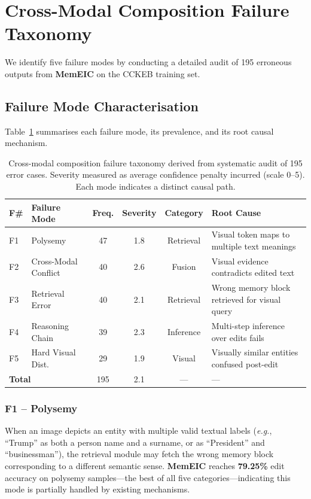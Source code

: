 \documentclass[11pt]{article}
\newcommand{\eg}{\textit{e.g.}}
\newcommand{\memeic}{\textbf{MemEIC}}
\begin{document}
\section{Cross-Modal Composition Failure Taxonomy}
\label{sec:taxonomy}

We identify five failure modes by conducting a detailed audit of 195 erroneous
outputs from \memeic{} on the CCKEB training set.

\subsection{Failure Mode Characterisation}

Table~\ref{tab:taxonomy} summarises each failure mode, its prevalence, and its
root causal mechanism.

\begin{table}[t]
\centering
\caption{Cross-modal composition failure taxonomy derived from systematic audit
of 195 error cases. Severity measured as average confidence penalty incurred
(scale 0--5). Each mode indicates a distinct causal path.}
\label{tab:taxonomy}
\small
\begin{tabular}{@{}llcccl@{}}
\toprule
\textbf{F\#} & \textbf{Failure Mode} & \textbf{Freq.} & \textbf{Severity} & \textbf{Category} & \textbf{Root Cause} \\
\midrule
F1 & Polysemy           & 47 & 1.8 & Retrieval & Visual token maps to multiple text meanings \\
F2 & Cross-Modal Conflict & 40 & 2.6 & Fusion & Visual evidence contradicts edited text \\
F3 & Retrieval Error    & 40 & 2.1 & Retrieval & Wrong memory block retrieved for visual query \\
F4 & Reasoning Chain   & 39 & 2.3 & Inference & Multi-step inference over edits fails \\
F5 & Hard Visual Dist. & 29 & 1.9 & Visual & Visually similar entities confused post-edit \\
\midrule
\multicolumn{2}{l}{\textbf{Total}} & 195 & 2.1 & --- & --- \\
\bottomrule
\end{tabular}
\end{table}

\subsubsection{F1 -- Polysemy}
When an image depicts an entity with multiple valid textual labels (\eg,
``Trump'' as both a person name and a surname, or as ``President'' and
``businessman''), the retrieval module may fetch the wrong memory block
corresponding to a different semantic sense. \memeic{} reaches
\textbf{79.25\%} edit accuracy on polysemy samples---the best of all five
categories---indicating this mode is partially handled by existing mechanisms.
\end{document}
